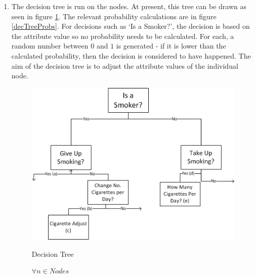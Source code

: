 \documentclass[]{article}
\begin{document}
\begin{enumerate}
\item The decision tree is run on the nodes. At present, this tree can be drawn as seen in figure \ref{dectree}. The relevant probability calculations are in figure \ref{decTreeProbs}. For decisions such as `Is a Smoker?', the decision is based on the attribute value so no probability needs to be calculated. For each, a random number between $0$ and $1$ is generated - if it is lower than the calculated probability, then the decision is considered to have happened. The aim of the decision tree is to adjust the attribute values of the individual node. 
\begin{figure}
\begin{center}
\includegraphics{DecTreeBasic2.png}
\label{dectree}
\caption{Decision Tree}
\end{center}
\end{figure}


\begin{figure}
	$\forall n \in Nodes$


\end{figure}
\end{enumerate}
\end{document}
